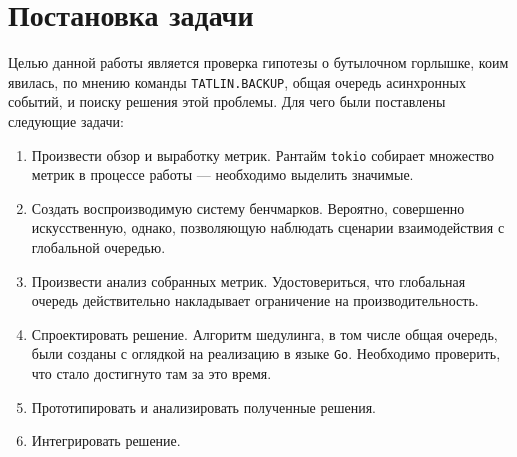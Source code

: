 
\section{Постановка задачи}
\label{sec:task}

Целью данной работы является проверка гипотезы о бутылочном горлышке, коим явилась, по мнению команды \verb|TATLIN.BACKUP|, общая очередь асинхронных событий, и поиску решения этой проблемы. Для чего были поставлены следующие задачи:

\begin{enumerate}
    \item Произвести обзор и выработку метрик. Рантайм \verb|tokio| собирает множество метрик в процессе работы --- необходимо выделить значимые.
    \item Создать воспроизводимую систему бенчмарков. Вероятно, совершенно искусственную, однако, позволяющую наблюдать сценарии взаимодействия с глобальной очередью.
    \item Произвести анализ собранных метрик. Удостовериться, что глобальная очередь действительно накладывает ограничение на производительность.
    \item Спроектировать решение. Алгоритм шедулинга, в том числе общая очередь, были созданы с оглядкой на реализацию в языке \verb|Go|. Необходимо проверить, что стало достигнуто там за это время.
    \item Прототипировать и анализировать полученные решения.
    \item Интегрировать решение.
\end{enumerate}
